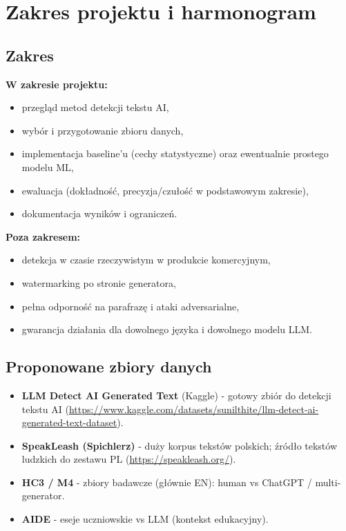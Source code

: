 \section{Zakres projektu i harmonogram}

\subsection{Zakres}

\textbf{W zakresie projektu:}
\begin{itemize}
	\item przegląd metod detekcji tekstu AI,
	\item wybór i przygotowanie zbioru danych,
	\item implementacja baseline'u (cechy statystyczne) oraz ewentualnie prostego modelu ML,
	\item ewaluacja (dokładność, precyzja/czułość w podstawowym zakresie),
	\item dokumentacja wyników i ograniczeń.
\end{itemize}

\textbf{Poza zakresem:}
\begin{itemize}
	\item detekcja w czasie rzeczywistym w produkcie komercyjnym,
	\item watermarking po stronie generatora,
	\item pełna odporność na parafrazę i ataki adversarialne,
	\item gwarancja działania dla dowolnego języka i dowolnego modelu LLM.
\end{itemize}

\subsection{Proponowane zbiory danych}

\begin{itemize}
	\item \textbf{LLM Detect AI Generated Text} (Kaggle) - gotowy zbiór do detekcji tekstu AI
	(\url{https://www.kaggle.com/datasets/sunilthite/llm-detect-ai-generated-text-dataset}).
	\item \textbf{SpeakLeash (Spichlerz)} - duży korpus tekstów polskich; źródło tekstów ludzkich do zestawu PL
	(\url{https://speakleash.org/}).
	\item \textbf{HC3 / M4} - zbiory badawcze (głównie EN): human vs ChatGPT / multi-generator.
	\item \textbf{AIDE} - eseje uczniowskie vs LLM (kontekst edukacyjny).
\end{itemize}

